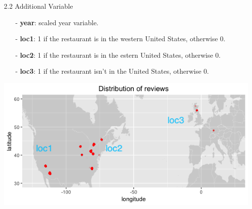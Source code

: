 \documentclass[10pt]{beamer}
\begin{document}
\begin{frame}{2.2 Additional Variable}

\begin{itemize}
	\item[-] \textbf{year}: scaled year variable.
	
	\item[-] \textbf{loc1}: 1 if the restaurant is in the western United States, otherwise 0.
	
	\item[-] \textbf{loc2}: 1 if the restaurant is in the estern United States, otherwise 0.
	
	\item[-] \textbf{loc3}: 1 if the restaurant isn't in the United States, otherwise 0.
	
\end{itemize}
\includegraphics[scale=0.4]{../image/worldmap.png}
\end{frame}
\end{document}

